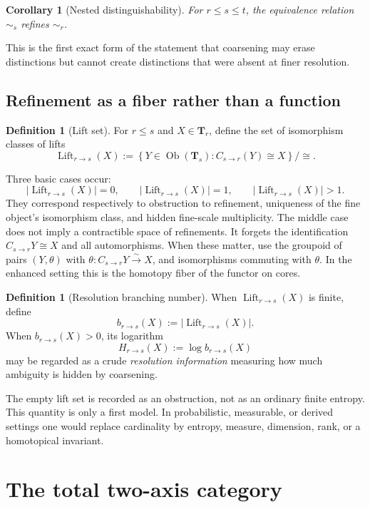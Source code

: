 \documentclass[11pt]{article}
\newtheorem{corollary}[theorem]{Corollary}
\theoremstyle{definition}
\newtheorem{definition}[theorem]{Definition}
\theoremstyle{remark}
\newcommand{\Tcat}{\mathbf T}
\newcommand{\Ob}{\operatorname{Ob}}
\newcommand{\Lift}{\operatorname{Lift}}
\begin{document}
\begin{corollary}[Nested distinguishability]\label{cor:nested}
For $r\le s\le t$, the equivalence relation $\sim_s$ refines $\sim_r$.
\end{corollary}

This is the first exact form of the statement that coarsening may erase distinctions but cannot create distinctions that were absent at finer resolution.

\subsection{Refinement as a fiber rather than a function}

\begin{definition}[Lift set]
For $r\le s$ and $X\in\Tcat_r$, define the set of isomorphism classes of lifts
\[
\Lift_{r\to s}(X)
:=
\left\{
Y\in\Ob(\Tcat_s):C_{s\to r}(Y)\cong X
\right\}/\cong.
\]
\end{definition}

Three basic cases occur:
\[
|\Lift_{r\to s}(X)|=0,
\qquad
|\Lift_{r\to s}(X)|=1,
\qquad
|\Lift_{r\to s}(X)|>1.
\]
They correspond respectively to obstruction to refinement, uniqueness of the fine object's isomorphism class, and hidden fine-scale multiplicity. The middle case does not imply a contractible space of refinements. It forgets the identification $C_{s\to r}Y\cong X$ and all automorphisms. When these matter, use the groupoid of pairs $(Y,\theta)$ with $\theta:C_{s\to r}Y\xrightarrow{\sim}X$, and isomorphisms commuting with $\theta$. In the enhanced setting this is the homotopy fiber of the functor on cores.

\begin{definition}[Resolution branching number]
When $\Lift_{r\to s}(X)$ is finite, define
\[
b_{r\to s}(X):=|\Lift_{r\to s}(X)|.
\]
When $b_{r\to s}(X)>0$, its logarithm
\[
H_{r\to s}(X):=\log b_{r\to s}(X)
\]
may be regarded as a crude \emph{resolution information} measuring how much ambiguity is hidden by coarsening.
\end{definition}

The empty lift set is recorded as an obstruction, not as an ordinary finite entropy. This quantity is only a first model. In probabilistic, measurable, or derived settings one would replace cardinality by entropy, measure, dimension, rank, or a homotopical invariant.

\section{The total two-axis category}
\end{document}

